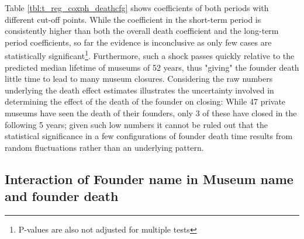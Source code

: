 \documentclass[12pt]{article}
\begin{document}
Table \ref{tbl:t_reg_coxph_deathcfg} shows coefficients of both periods with different cut-off points.
While the coefficient in the short-term period is consistently higher than both the overall death coefficient and the long-term period coefficients, so far the evidence is inconclusive as only few cases are statistically significant\footnote{P-values are also not adjusted for multiple tests}.
Furthermore, such a shock passes quickly relative to the predicted median lifetime of museums of 52 years, thus "giving" the founder death little time to lead to many museum closures. 
Considering the raw numbers underlying the death effect estimates illustrates the uncertainty involved in determining the effect of the death of the founder on closing: 
While 47 private museums have seen the death of their founders, only 3 of these have closed in the following 5 years; given such low numbers it cannot be ruled out that the statistical significance in a few configurations of founder death time results from random fluctuations rather than an underlying pattern.
\subsection*{Interaction of Founder name in Museum name and founder death}
\end{document}
